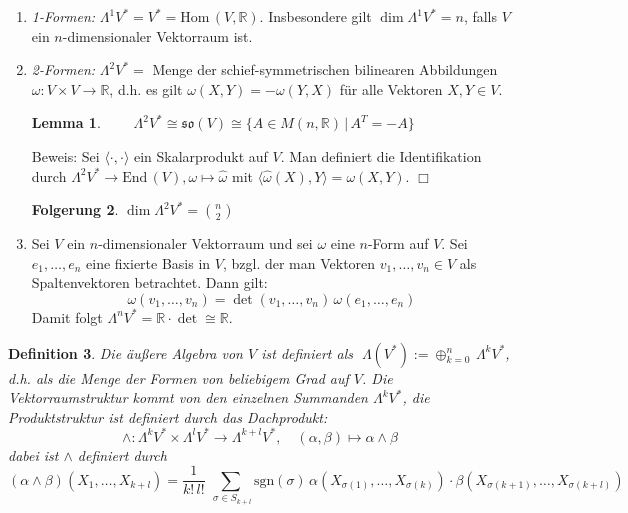\documentclass[12pt,a4paper]{article}
\def\R{\mathbb{R}}
\def\so{\mathfrak{so}}
\def\End{\mathrm{End}\,}
\def\Hom{\mathrm{Hom}\,}
\def\la{\langle}
\def\ra{\rangle}
\def\sgn{\mathrm{sgn}}
\newtheorem{Lemma}{Lemma}[section]
\newtheorem{Folgerung}[Lemma]{Folgerung}
\newtheorem{Definition}[Lemma]{Definition}
\def\qed{\quad\hfill\ensuremath{\Box}}
\begin{document}
\begin{enumerate}
\item
{\it 1-Formen:}
$\Lambda^1 V^* = V^* = \Hom(V, \R)$.
Insbesondere gilt $\dim \Lambda^1 V^* = n$, falls $V$ ein $n$-dimensionaler Vektorraum ist.
\item
{\it 2-Formen:}
$\Lambda^2 V^* =$ Menge der schief-symmetrischen bilinearen Abbildungen $\omega : V \times V \rightarrow \R$,
d.h. es gilt $\omega(X, Y) = -\omega (Y,X)$ f\"ur alle Vektoren $X,Y\in V$.

\begin{Lemma}
$
\qquad \Lambda^2 V^* \cong \so(V) \cong \{ A \in M(n,\R) \,|\, A^T = -A\}
$
\end{Lemma}
Beweis:
Sei $\la \cdot , \cdot \ra$ ein Skalarprodukt auf $V$. Man definiert die Identifikation durch
$\Lambda^2V^* \rightarrow \End (V), \omega \mapsto \hat \omega$ mit
$ \la \hat \omega(X), Y \ra = \omega(X, Y) $.
\qed

\begin{Folgerung}
\qquad $ \dim \Lambda^2 V^* = { n \choose 2}$
\end{Folgerung}

\item

Sei $V$ ein $n$-dimensionaler Vektorraum und sei $\omega$ eine $n$-Form auf $V$. Sei
$e_1, \ldots, e_n$ eine fixierte Basis in $V$, bzgl. der man Vektoren $v_1, \ldots, v_n \in V$
als Spaltenvektoren betrachtet. Dann gilt:
$$
\omega (v_1, \ldots, v_n) = \det (v_1, \ldots, v_n)\, \omega(e_1, \ldots, e_n)
$$
Damit folgt $\Lambda^n V^* = \R \cdot \det \cong \R$.
\end{enumerate}

\bigskip

\begin{Definition}
Die {\em \"au\ss ere Algebra} von $V$ ist definiert als $\; \Lambda(V^*) := \oplus^n_{k=0} \, \Lambda^k V^*$, d.h. als
die Menge der Formen von beliebigem Grad auf $V$. Die Vektorraumstruktur kommt von den einzelnen Summanden
$\Lambda^k V^*$, die Produktstruktur ist definiert durch das {\em Dachprodukt}:
$$
\wedge : \Lambda^k V^* \times \Lambda^l V^* \longrightarrow \Lambda^{k+l} V^*, \quad
(\alpha, \beta) \mapsto \alpha \wedge \beta
$$
dabei ist $\wedge $ definiert durch
$$
(\alpha \wedge \beta)(X_1, \ldots, X_{k+l})
=
\frac{1}{k!\,l!}\,\sum_{\;\sigma \in S_{k+l}} \sgn(\sigma)\, \alpha(X_{\sigma(1)}, \ldots, X_{\sigma(k)})
\cdot \beta(X_{\sigma(k+1)}, \ldots, X_{\sigma(k+l)})
$$
\end{Definition}
\end{document}
